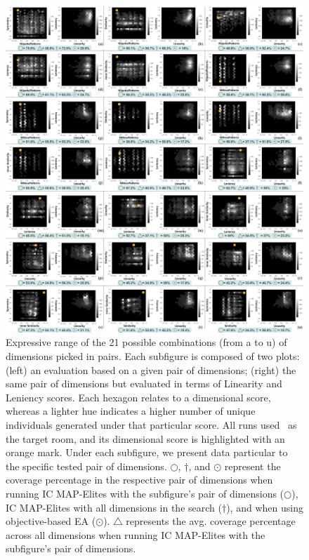 
\begin{figure}[h!]
\centerline{\includegraphics[width=\textwidth]{figures/figure4.png}}
\caption{Expressive range of the 21 possible combinations (from a to u) of dimensions picked in pairs. Each subfigure is composed of two plots: (left) an evaluation based on a given pair of dimensions; (right) the same pair of dimensions but evaluated in terms of Linearity and Leniency scores. Each hexagon relates to a dimensional score, whereas a lighter hue indicates a higher number of unique individuals generated under that particular score. All runs used~ as the target room, and its dimensional score is highlighted with an orange mark. Under each subfigure, we present data particular to the specific tested pair of dimensions. $\bigcirc$, $\dagger$, and $\odot$ represent the coverage percentage in the respective pair of dimensions when running IC MAP-Elites with the subfigure's pair of dimensions ($\bigcirc$), IC MAP-Elites with all dimensions in the search ($\dagger$), and when using objective-based EA ($\odot$). $\bigtriangleup$ represents the avg. coverage percentage across all dimensions when running IC MAP-Elites with the subfigure's pair of dimensions.
}
\end{figure}
